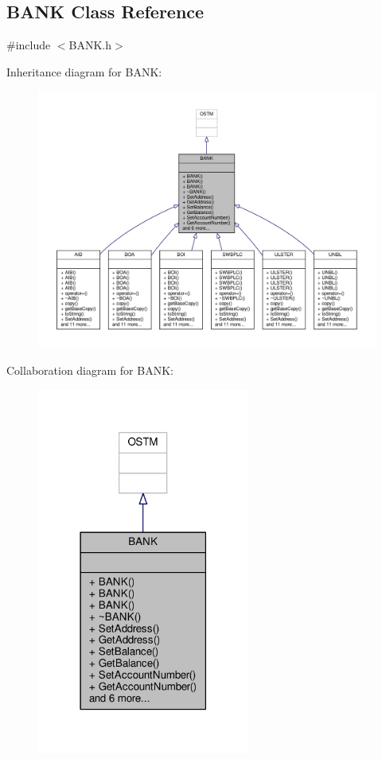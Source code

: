 \hypertarget{class_b_a_n_k}{}\subsection{B\+A\+NK Class Reference}
\label{class_b_a_n_k}


{\ttfamily \#include $<$B\+A\+N\+K.\+h$>$}



Inheritance diagram for B\+A\+NK\+:
\nopagebreak
\begin{figure}[H]
\begin{center}
\leavevmode
\includegraphics[width=350pt]{class_b_a_n_k__inherit__graph}
\end{center}
\end{figure}


Collaboration diagram for B\+A\+NK\+:
\nopagebreak
\begin{figure}[H]
\begin{center}
\leavevmode
\includegraphics[width=198pt]{class_b_a_n_k__coll__graph}
\end{center}
\end{figure}
